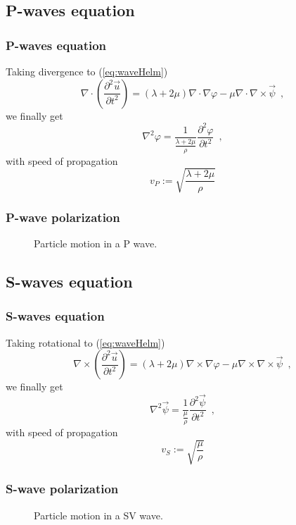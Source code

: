 \documentclass{beamer}
\newcommand{\pardiff}[2]{\frac{\partial #1}{\partial #2}}
\begin{document}
\subsection{P-waves equation}
\begin{frame}\frametitle{P-waves equation}
Taking divergence to (\ref{eq:waveHelm})
\[\nabla\cdot \left( \pardiff{^2 \vec{u}}{t^2} \right)= (\lambda +2\mu) \nabla\cdot \nabla \varphi - \mu\nabla\cdot\nabla\times \vec{\psi} \enspace , \]
we finally get
\begin{equation}
\nabla^2 \varphi = \frac{1}{\frac{\lambda + 2\mu}{\rho}} \pardiff{^2 \varphi}{t^2} \enspace ,
\label{eq:pWave}
\end{equation}
with speed of propagation
\[v_P := \sqrt{\frac{\lambda + 2\mu}{\rho}}\]
\end{frame}

\begin{frame}\frametitle{P-wave polarization}
\begin{figure}[H]
\centering
{}
\caption{Particle motion in a P wave.}
\label{vid:P0}
\end{figure}
\end{frame}

\subsection{S-waves equation}
\begin{frame}\frametitle{S-waves equation}
Taking rotational to (\ref{eq:waveHelm})
\[\nabla\times \left( \pardiff{^2 \vec{u}}{t^2} \right)= (\lambda +2\mu) \nabla\times \nabla \varphi - \mu\nabla\times\nabla\times \vec{\psi} \enspace , \]
we finally get
\begin{equation}
\nabla^2 \vec{\psi} = \frac{1}{\frac{\mu}{\rho}} \pardiff{^2 \vec{\psi}}{t^2} \enspace ,
\label{eq:SWave}
\end{equation}
with speed of propagation
\[v_S := \sqrt{\frac{\mu}{\rho}}\]
\end{frame}

\begin{frame}\frametitle{S-wave polarization}
\begin{figure}[H]
\centering
{}
\caption{Particle motion in a SV wave.}
\label{vid:SV0}
\end{figure}
\end{frame}
\end{document}
